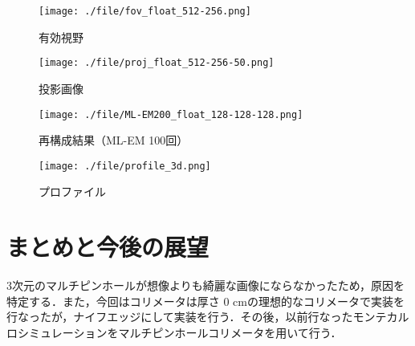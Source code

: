 \documentclass[dvipdfmx,autodetect-engine,twocolumn,10pt]{jsarticle}%
\begin{document}
\begin{figure}[htbp]
  \begin{center}
    \texttt{[image: ./file/fov\_float\_512-256.png]}\\
    \caption{有効視野}
    \label{fov}
  \end{center}
\end{figure}

\begin{figure}[htbp]
  \begin{center}
    \texttt{[image: ./file/proj\_float\_512-256-50.png]}\\
    \caption{投影画像}
    \label{proj_3d}
  \end{center}
\end{figure}

\begin{figure}[htbp]
  \begin{center}
    \texttt{[image: ./file/ML-EM200\_float\_128-128-128.png]}\\
    \caption{再構成結果（ML-EM 100回）}
    \label{reconst_3d}
  \end{center}
\end{figure}

\begin{figure}[htbp]
  \begin{center}
    \texttt{[image: ./file/profile\_3d.png]}\\
    \caption{プロファイル}
    \label{profile_3d}
  \end{center}
\end{figure}

\section{まとめと今後の展望}
3次元のマルチピンホールが想像よりも綺麗な画像にならなかったため，原因を特定する．また，今回はコリメータは厚さ 0 cmの理想的なコリメータで実装を行なったが，ナイフエッジにして実装を行う．その後，以前行なったモンテカルロシミュレーションをマルチピンホールコリメータを用いて行う．
\end{document}
